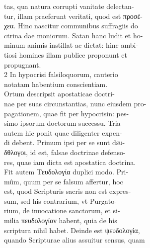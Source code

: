 \documentclass{article}
\begin{document}
\begin{pages}
                tas, qua natura corrupti vanitate delectan- \\
                tur, illam praeferunt veritati, quod est προσέ- \\
                χεα. Hinc nascitur communibus suffragiis do \\
                ctrina dae moniorum. Satan hanc ludit et ho- \\
                minum animis instillat ac dictat: hinc ambi- \\
                tiosi homines illam publice proponunt et \\
                propugnant. \\
                2 In hypocrisi falsiloquorum, cauterio \\
                notatam habentium conscientiam. \\
                Ortum descripsit apostaticae doctri- \\
                nae per suas circunstantias, nunc eiusdem pro- \\
                pagationem, quae fit per hypocrisin: pes- \\
                simo ipsorum doctorum successu. Tria \\
                autem hic ponit quae diligenter expen- \\
                di debent. Primum ipsi per se sunt dευ- \\
                δθλογοι, id est, falsae doctrinae defenso- \\
                res, quae iam dicta est apostatica doctrina. \\
                Fit autem Τευδολογία duplici modo. Pri- \\
                mûm, quum per se falsum affertur, hoc \\
                est, quod Scripturis sacris non est expres- \\
                sum, sed his contrarium, vt Purgato- \\
                rium, de inuocatione sanctorum, et si- \\
                milia πευδολογίαν habent, quia de his \\
                scriptura nihil habet. Deinde est ψευδολογία, \\
                quando Scripturae alius assuitur sensus, quam \\

\end{pages}
\end{document}
